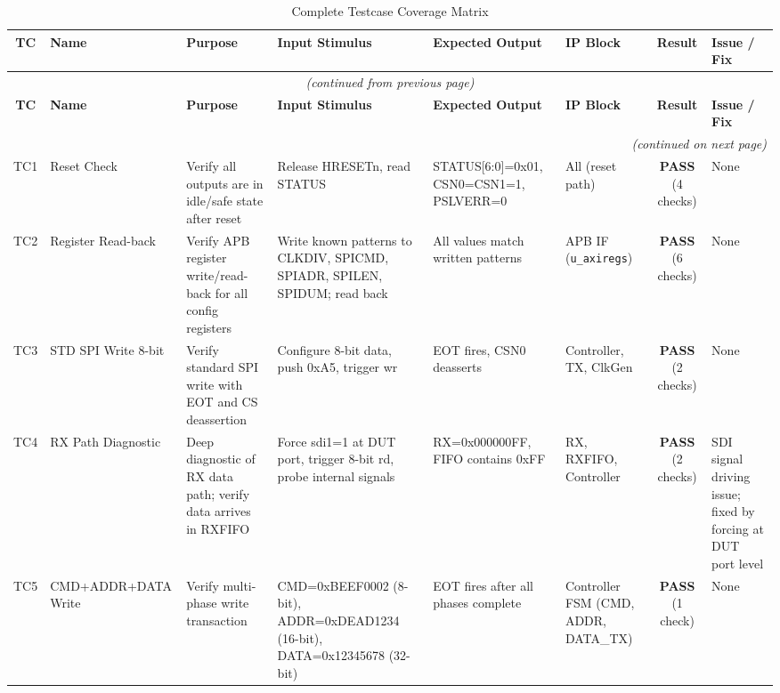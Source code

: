 \begin{landscape}
\begin{longtable}{@{}clp{3cm}p{3cm}p{2.5cm}p{2cm}cp{3cm}@{}}
\caption{Complete Testcase Coverage Matrix}
\label{tab:tc_matrix} \\
\toprule
\textbf{TC} & \textbf{Name} & \textbf{Purpose} & \textbf{Input Stimulus} & \textbf{Expected Output} & \textbf{IP Block} & \textbf{Result} & \textbf{Issue / Fix} \\
\midrule
\endfirsthead
\multicolumn{8}{c}{\textit{(continued from previous page)}} \\
\toprule
\textbf{TC} & \textbf{Name} & \textbf{Purpose} & \textbf{Input Stimulus} & \textbf{Expected Output} & \textbf{IP Block} & \textbf{Result} & \textbf{Issue / Fix} \\
\midrule
\endhead
\midrule
\multicolumn{8}{r}{\textit{(continued on next page)}} \\
\endfoot
\bottomrule
\endlastfoot

TC1 & Reset Check & Verify all outputs are in idle/safe state after reset & Release HRESETn, read STATUS & STATUS[6:0]=0x01, CSN0=CSN1=1, PSLVERR=0 & All (reset path) & \textbf{PASS} (4 checks) & None \\

TC2 & Register Read-back & Verify APB register write/read-back for all config registers & Write known patterns to CLKDIV, SPICMD, SPIADR, SPILEN, SPIDUM; read back & All values match written patterns & APB IF (\texttt{u\_axiregs}) & \textbf{PASS} (6 checks) & None \\

TC3 & STD SPI Write 8-bit & Verify standard SPI write with EOT and CS deassertion & Configure 8-bit data, push 0xA5, trigger wr & EOT fires, CSN0 deasserts & Controller, TX, ClkGen & \textbf{PASS} (2 checks) & None \\

TC4 & RX Path Diagnostic & Deep diagnostic of RX data path; verify data arrives in RXFIFO & Force sdi1=1 at DUT port, trigger 8-bit rd, probe internal signals & RX=0x000000FF, FIFO contains 0xFF & RX, RXFIFO, Controller & \textbf{PASS} (2 checks) & SDI signal driving issue; fixed by forcing at DUT port level \\

TC5 & CMD+ADDR+DATA Write & Verify multi-phase write transaction & CMD=0xBEEF0002 (8-bit), ADDR=0xDEAD1234 (16-bit), DATA=0x12345678 (32-bit) & EOT fires after all phases complete & Controller FSM (CMD, ADDR, DATA\_TX) & \textbf{PASS} (1 check) & None \\


\end{longtable}
\end{landscape}
